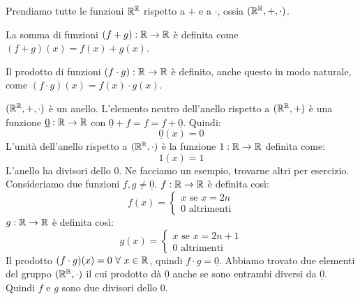 \begin{exmp}
Prendiamo tutte le funzioni $\mathbb{R}^{\mathbb{R}}$ rispetto a $+$ e a $\cdot$, ossia $(\mathbb{R}^{\mathbb{R}}, +, \cdot)$.

La somma di funzioni $(f + g) : \mathbb{R} \to \mathbb{R}$ \`e definita come $(f + g) (x) = f(x) + g(x) $.

Il prodotto di funzioni $(f \cdot g) : \mathbb{R} \to \mathbb{R}$ \`e definito, anche questo in modo naturale, come $(f \cdot g) (x) = f(x) \cdot g(x)$.

$(\mathbb{R}^{\mathbb{R}}, +, \cdot)$ \`e un anello. L'elemento neutro dell'anello rispetto a $(\mathbb{R}^{\mathbb{R}}, +)$ \`e una funzione $\underline{0} : \mathbb{R} \to \mathbb{R}$ con $\underline{0} + f = f = f + \underline{0}$. Quindi:
\[
\underline{0} (x) = 0
\]
L'unit\`a dell'anello rispetto a $(\mathbb{R}^{\mathbb{R}}, \cdot)$ \`e la funzione $1 : \mathbb{R} \to \mathbb{R}$ definita come:
\[
1(x) = 1
\]
L'anello ha divisori dello 0. Ne facciamo un esempio, trovarne altri per esercizio. Consideriamo due funzioni $f, g \neq \underline{0}$. $f : \mathbb{R} \to \mathbb{R}$ \`e definita cos\`i:
\[
f(x) =
\begin{cases}
x \text{ se } x = 2n \\
0 \text{ altrimenti}
\end{cases}
\]
$g : \mathbb{R} \to \mathbb{R}$ \`e definita cos\`i:
\[
g(x) =
\begin{cases}
x \text{ se } x = 2n + 1 \\
0 \text{ altrimenti}
\end{cases}
\]
Il prodotto $(f \cdot g) (x) = 0 \forall x \in \reals$, quindi $f \cdot g = \underline{0}$. Abbiamo trovato due elementi del gruppo $(\mathbb{R}^{\mathbb{R}}, \cdot)$ il cui prodotto d\`a $\underline{0}$ anche se sono entrambi diversi da $\underline{0}$. Quindi $f$ e $g$ sono due divisori dello 0.
\end{exmp}

